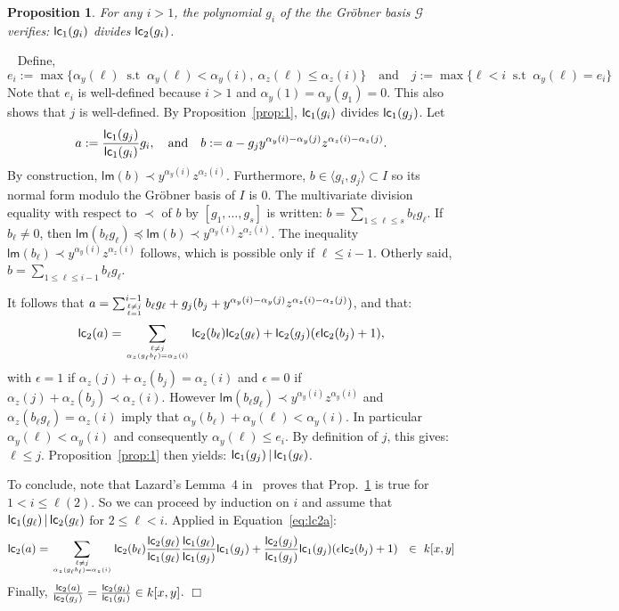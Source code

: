 \documentclass[a4paper,11pt]{article}
\newcommand{\proof}{\noindent {\sc Proof:}~}
\newcommand{\foorp}{\hfill $\Box$}
\def\G{\ensuremath{\mathcal{G}}}
\def\lm{\ensuremath{{\mathsf{lm}}}}
\def\lc{\ensuremath{{\sf lc}}}
\def\l{\ensuremath{\langle}}
\def\r{\ensuremath{\rangle}}
\newtheorem{Prop}{Proposition}
\begin{document}
\begin{Prop}\label{prop:2}
For any $i>1$, the polynomial  $g_i$ of the
 the Gr\"obner basis $\G$ verifies: $\lc_1(g_i)$ divides $\lc_2(g_i)$.
\end{Prop}
\proof
Define,
$$e_i:=\max\{ \alpha_y(\ell)\ \text{ s.t }
\ \alpha_y(\ell) < \alpha_y(i),\ \alpha_z(\ell) \le
\alpha_z(i)\}
\quad \text{and}\quad j:=\max\{\ell <i\ \text{ s.t }
\ \alpha_y(\ell) = e_i\} 
$$
Note that $e_i$ is well-defined
because $i>1$ and $\alpha_y(1)=\alpha_y(g_1)=0$.
This also shows that $j$ is well-defined.
By Proposition~\ref{prop:1}, $\lc_1(g_i)$
divides $\lc_1(g_j)$. Let
$$
a:= \frac{\lc_1(g_j)}{\lc_1(g_i)} g_i,
\quad \text{and} \quad b:= a - g_j y^{\alpha_y(i)-\alpha_y(j)}
z^{\alpha_z(i)-\alpha_z(j)}.
$$
By construction, $\lm(b)\prec y^{\alpha_y(i)}
z^{\alpha_z(i)}$. Furthermore, $b\in \l g_i,g_j\r\subset I$
so its normal form modulo the Gr\"obner basis
of $I$ is 0. The multivariate division equality
with respect to $\prec$ of $b$ by $[g_1,\ldots,g_s]$
is written: $b=\sum_{1\le \ell\le s}b_\ell g_\ell$.
If $b_\ell \not = 0$, then $\lm(b_\ell g_\ell)
\preccurlyeq \lm(b)\prec y^{\alpha_y(i)}
z^{\alpha_z(i)}$. The inequality $\lm(b_\ell) \prec 
y^{\alpha_y(i)}
z^{\alpha_z(i)}$ follows, which is possible 
only if $\ell \le i-1$.
Otherly said, $b=\sum_{1\le \ell \le i-1} b_\ell g_\ell$.

It follows that
$
a= \sum_{\ell\not=j \atop \ell=1}^{i-1} 
b_\ell g_\ell + g_j (b_j + y^{\alpha_y(i)-\alpha_y(j)}
z^{\alpha_z(i)-\alpha_z(j)})$,
and that:
\begin{equation}\label{eq:lc2a}
\lc_2(a) = \sum_{\ell\not=j \atop \alpha_z(g_\ell b_\ell)
=\alpha_z(i)} 
\lc_2(b_\ell)\lc_2( g_\ell) + \lc_2(g_j) (\epsilon \lc_2(b_j) + 1),
\end{equation}
with $\epsilon =1$  if 
$\alpha_z(j)+\alpha_z(b_j)= \alpha_z(i)$
and
$\epsilon =0$  if $\alpha_z(j)+\alpha_z(b_j)\prec \alpha_z(i)$.
However $\lm(b_\ell g_\ell) \prec
y^{\alpha_y(i)} z^{\alpha_y(i)} $
and $\alpha_z(b_\ell g_\ell)=\alpha_z(i)$
imply that $\alpha_y(b_\ell) + \alpha_y(\ell) < \alpha_y(i)$.
In particular $\alpha_y(\ell)< \alpha_y(i)$
and consequently $\alpha_y(\ell)\le e_i$.
By definition of $j$,
this gives:
$\ell \le j$.
Proposition~\ref{prop:1} then yields: $\lc_1(g_j) \, |\,  \lc_1(g_\ell)$.


To conclude, note that Lazard's Lemma~4
in~\cite{Laz85}
proves that Prop.~\ref{prop:2} is true for
$1 < i \le \ell(2)$. So we can proceed by induction
on $i$ and assume that $\lc_1(g_\ell) \, |\,  \lc_2(g_\ell)$
for $2 \le \ell <i$. Applied in Equation~\eqref{eq:lc2a}:
$$
\lc_2(a) = \sum_{\ell \not=j\atop \alpha_z(g_\ell b_\ell)
=\alpha_z(i)}
\lc_2(b_\ell) \frac{\lc_2(g_\ell)}{\lc_1(g_\ell)}
\frac{\lc_1(g_\ell)}{\lc_1(g_j)} \lc_1(g_j)
+ \frac{\lc_2(g_j)}{\lc_1(g_j)}\lc_1(g_j)
(\epsilon \lc_2(b_j) + 1)\ \ \in\  k[x,y]
$$
Finally, $\frac{\lc_2(a)}{\lc_2(g_j)} =
\frac{\lc_2(g_i)}{\lc_1(g_i)} \in k[x,y]$.
\foorp
\medskip
\end{document}
